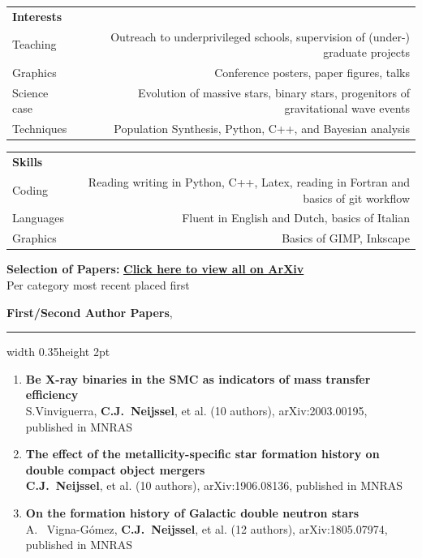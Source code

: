 \documentclass[]{res} %
\begin{document}
\begin{tabular}{L!{\VRule}R}
\Large \bf Interests \normalsize & \\ [5pt]

Teaching  & {Outreach to underprivileged schools, supervision of (under-) graduate projects}\\[5pt]

Graphics  & {Conference posters, paper figures, talks}\\[5pt]

Science case   &{Evolution of massive stars, binary stars, progenitors of gravitational wave events}\\[5pt]

Techniques  & {Population Synthesis, Python, C++, and Bayesian analysis}\\[5pt]




\end{tabular}


\begin{tabular}{L!{\VRule}R}
\Large \bf Skills \normalsize & \\ [5pt]

Coding   & {Reading writing in Python, C++, Latex, reading in Fortran and basics of git workflow}\\[5pt]

Languages & {Fluent in English and Dutch, basics of Italian}\\[5pt]

Graphics  & {Basics of GIMP, Inkscape}

\end{tabular}

\newpage


{\Large{\textbf{Selection of Papers:} }\textbf{\color{blue} \href{https://arxiv.org/search/?query=Neijssel\%2C+C&searchtype=author&abstracts=show&order=-announced_date_first&size=50}{Click here to view all on ArXiv}}\\}
Per category most recent placed first

{\large \textbf{First/Second Author Papers}, }
{\color{lightgray}\hrule width 0.35\textwidth height 2pt}
\begin{enumerate}

\item \textbf{Be X-ray binaries in the SMC as indicators of mass transfer efficiency }\\
S.Vinviguerra, \textbf{C.J.\ Neijssel}, et al. (10 authors), arXiv:2003.00195, published in MNRAS

\item \textbf{The effect of the metallicity-specific star formation history on double compact object mergers}\\
\textbf{C.J.\ Neijssel}, et al. (10 authors), arXiv:1906.08136, published in MNRAS

\item \textbf{On the formation history of Galactic double neutron stars}\\
A. \ Vigna-G{\'o}mez, \textbf{C.J.\ Neijssel}, et al. (12 authors), arXiv:1805.07974, published in MNRAS
\end{enumerate}
\end{document}
